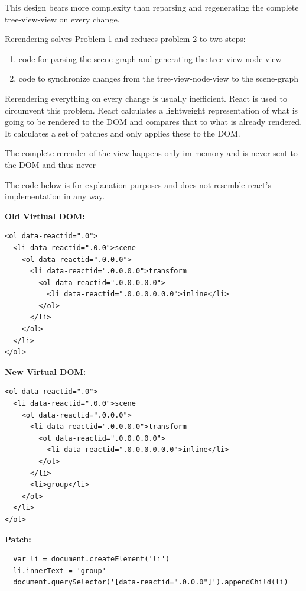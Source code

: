 This design bears more complexity than reparsing and regenerating the
complete tree-view-view on every change.

Rerendering solves Problem 1 and reduces problem 2 to two steps:\\
\begin{enumerate}
  \item code for parsing the scene-graph and generating the tree-view-node-view
  \item code to synchronize changes from the tree-view-node-view to the scene-graph
\end{enumerate}


Rerendering everything on every change is usually inefficient. React is
used to circumvent this problem. React calculates a lightweight
representation of what is going to be rendered to the DOM and compares
that to what is already rendered. It calculates a set of patches and
only applies these to the DOM.

The complete rerender of the view happens only im memory and is never
sent to the DOM and thus never

The code below is for explanation purposes and does not resemble react's
implementation in any way.

\textbf{Old Virtiual DOM:}

\begin{verbatim}
<ol data-reactid=".0">
  <li data-reactid=".0.0">scene
    <ol data-reactid=".0.0.0">
      <li data-reactid=".0.0.0.0">transform
        <ol data-reactid=".0.0.0.0.0">
          <li data-reactid=".0.0.0.0.0.0">inline</li>
        </ol>
      </li>
    </ol>
  </li>
</ol>
\end{verbatim}

\textbf{New Virtual DOM:}
\begin{verbatim}
<ol data-reactid=".0">
  <li data-reactid=".0.0">scene
    <ol data-reactid=".0.0.0">
      <li data-reactid=".0.0.0.0">transform
        <ol data-reactid=".0.0.0.0.0">
          <li data-reactid=".0.0.0.0.0.0">inline</li>
        </ol>
      </li>
      <li>group</li>
    </ol>
  </li>
</ol>
\end{verbatim}

\textbf{Patch:}

\begin{verbatim}
  var li = document.createElement('li')
  li.innerText = 'group'
  document.querySelector('[data-reactid=".0.0.0"]').appendChild(li)
\end{verbatim}

